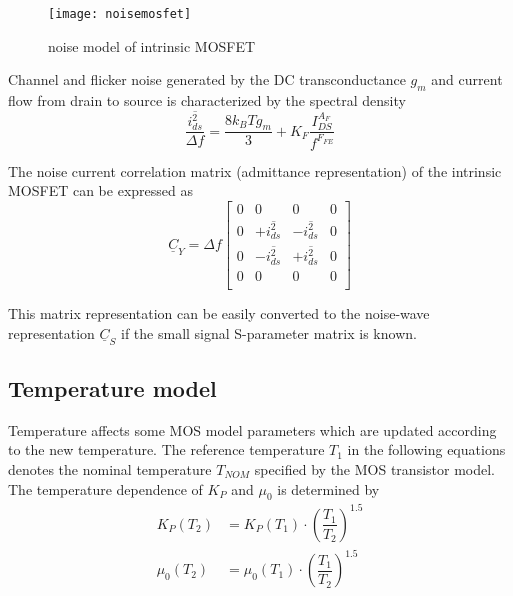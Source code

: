 \begin{figure}[ht]
\begin{center}
\texttt{[image: noisemosfet]}
\end{center}
\caption{noise model of intrinsic MOSFET}
\label{fig:noisemosfet}
\end{figure}
\FloatBarrier

Channel and flicker noise generated by the DC transconductance $g_m$
and current flow from drain to source is characterized by the spectral
density
\begin{equation}
\dfrac{\overline{i_{ds}^2}}{\Delta f} = \dfrac{8 k_B T g_m}{3} + K_F\dfrac{I_{DS}^{A_F}}{f^{F_{FE}}}
\end{equation}

The noise current correlation matrix (admittance representation) of
the intrinsic MOSFET can be expressed as
\begin{equation}
\underline{C}_Y = \Delta f
\begin{bmatrix}
0 & 0 & 0 & 0\\
0 & +\overline{i_{ds}^2} & -\overline{i_{ds}^2} & 0\\
0 & -\overline{i_{ds}^2} & +\overline{i_{ds}^2} & 0\\
0 & 0 & 0 & 0\\
\end{bmatrix}
\end{equation}

This matrix representation can be easily converted to the noise-wave
representation $\underline{C}_S$ if the small signal S-parameter
matrix is known.

\subsection{Temperature model}

Temperature affects some MOS model parameters which are updated
according to the new temperature.  The reference temperature $T_1$ in
the following equations denotes the nominal temperature $T_{NOM}$
specified by the MOS transistor model.  The temperature dependence of
$K_P$ and $\mu_0$ is determined by
\begin{align}
K_P\left(T_2\right) &= K_P\left(T_1\right)\cdot \left(\dfrac{T_1}{T_2}\right)^{1.5}\\
\mu_0\left(T_2\right) &= \mu_0\left(T_1\right)\cdot \left(\dfrac{T_1}{T_2}\right)^{1.5}
\end{align}

